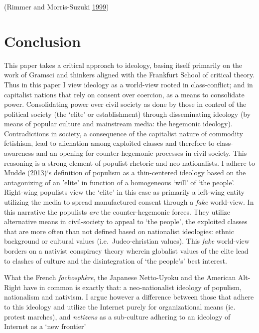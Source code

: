 \documentclass[10pt,british,A4paper,,openany]{memoir}
\begin{document}
(Rimmer and Morris-Suzuki
\protect\hyperlink{ref-rimmer_japanese_1999}{1999})

\section{Conclusion}\label{conclusion-1}

This paper takes a critical approach to ideology, basing itself
primarily on the work of Gramsci and thinkers aligned with the Frankfurt
School of critical theory. Thus in this paper I view ideology as a
world-view rooted in class-conflict; and in capitalist nations that rely
on consent over coercion, as a means to consolidate power. Consolidating
power over civil society as done by those in control of the political
society (the `elite' or establishment) through disseminating ideology
(by means of popular culture and mainstream media: the hegemonic
ideology). Contradictions in society, a consequence of the capitalist
nature of commodity fetishism, lead to alienation among exploited
classes and therefore to class-awareness and an opening for
counter-hegemonic processes in civil society. This reasoning is a strong
element of populist rhetoric and neo-nationalists. I adhere to Mudde
(\protect\hyperlink{ref-mudde_oxford_2013}{2013})`s definition of
populism as a thin-centered ideology based on the antagonizing of an
'elite' in function of a homogeneous `will' of `the people'. Right-wing
populists view the `elite' in this case as primarily a left-wing entity
utilizing the media to spread manufactured consent through a \emph{fake}
world-view. In this narrative the populists \emph{are} the
counter-hegemonic forces. They utilize alternative means in
civil-society to appeal to `the people', the exploited classes that are
more often than not defined based on nationalist ideologies: ethnic
background or cultural values (i.e.~Judeo-christian values). This
\emph{fake} world-view borders on a nativist conspiracy theory wherein
globalist values of the elite lead to clashes of culture and the
disintegration of `the people's' best interest.

What the French \emph{fachosphère}, the Japanese Netto-Uyoku and the
American Alt-Right have in common is exactly that: a neo-nationalist
ideology of populism, nationalism and nativism. I argue however a
difference between those that adhere to this ideology and utilize the
Internet purely for organizational means (ie. protest marches), and
\emph{netizens} as a sub-culture adhering to an ideology of Internet as
a `new frontier'
\end{document}
